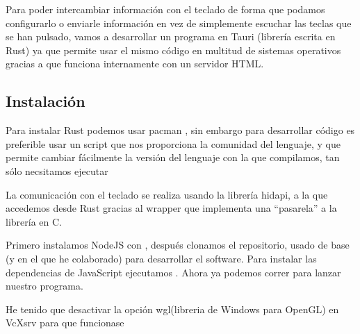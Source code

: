 Para poder intercambiar información con el teclado de forma que podamos configurarlo o enviarle información en vez de simplemente escuchar las teclas que se han pulsado, vamos a desarrollar un programa en Tauri\cite{tauri} (librería escrita en Rust\cite{rust}) ya que permite usar el mismo código en multitud de sistemas operativos gracias a que funciona internamente con un servidor HTML. 

\subsection{Instalación}
Para instalar Rust podemos usar pacman , sin embargo para desarrollar código es preferible usar un script que nos proporciona la comunidad del lenguaje, y que permite cambiar fácilmente la versión del lenguaje con la que compilamos, tan sólo necsitamos ejecutar 

La comunicación con el teclado se realiza usando la librería hidapi\cite{hidapi}, a la que accedemos desde Rust gracias al wrapper\cite{hidapi-rs} que implementa una ``pasarela'' a la librería en C.

Primero instalamos NodeJS\cite{nodejs} con , después clonamos el repositorio\cite{karl-xap}, usado de base (y en el que he colaborado) para desarrollar el software. \newline 
Para instalar las dependencias de JavaScript ejecutamos . Ahora ya podemos correr  para lanzar nuestro programa. \par

\hr
He tenido que desactivar la opción wgl(libreria de Windows para OpenGL) en VcXsrv para que funcionase
\hr
